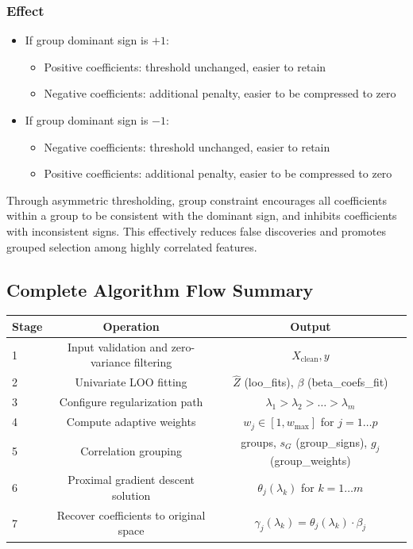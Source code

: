 \documentclass{article}
\begin{document}
\subsubsection{Effect}

\begin{itemize}
\item If group dominant sign is $+1$:
  \begin{itemize}
  \item Positive coefficients: threshold unchanged, easier to retain
  \item Negative coefficients: additional penalty, easier to be compressed to zero
  \end{itemize}
\item If group dominant sign is $-1$:
  \begin{itemize}
  \item Negative coefficients: threshold unchanged, easier to retain
  \item Positive coefficients: additional penalty, easier to be compressed to zero
  \end{itemize}
\end{itemize}

Through asymmetric thresholding, group constraint encourages all coefficients within a group to be consistent with the dominant sign, and inhibits coefficients with inconsistent signs. This effectively reduces false discoveries and promotes grouped selection among highly correlated features.

\subsection{Complete Algorithm Flow Summary}

\begin{center}
\begin{tabular}{lcc}
\hline
Stage & Operation & Output \\
\hline
1 & Input validation and zero-variance filtering & $X_{\text{clean}}, y$ \\
2 & Univariate LOO fitting & $\hat{Z}$ (loo\_fits), $\beta$ (beta\_coefs\_fit) \\
3 & Configure regularization path & $\lambda_1 > \lambda_2 > \dots > \lambda_m$ \\
4 & Compute adaptive weights & $w_j \in [1, w_{\text{max}}]$ for $j=1\dots p$ \\
5 & Correlation grouping & groups, $s_G$ (group\_signs), $g_j$ (group\_weights) \\
6 & Proximal gradient descent solution & $\theta_j(\lambda_k)$ for $k=1\dots m$ \\
7 & Recover coefficients to original space & $\gamma_j(\lambda_k) = \theta_j(\lambda_k) \cdot \beta_j$ \\
\hline
\end{tabular}
\end{center}
\end{document}
